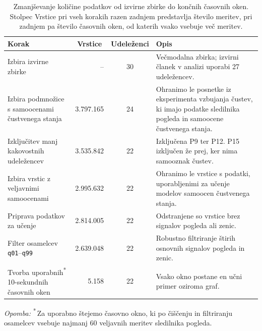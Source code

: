 \begin{table}[!htbp]
    \centering
    \caption{Zmanjševanje količine podatkov od izvirne zbirke \MAHNOB{} do končnih časovnih oken. Stolpec Vrstice pri vseh korakih razen zadnjem predstavlja število meritev, pri zadnjem pa število časovnih oken, od katerih vsako vsebuje več meritev.}
    \label{tab:mahnob-predobdelava}
    \small
    \begin{tabularx}{\textwidth}{@{}>{\raggedright\arraybackslash}p{} r c >{\raggedright\arraybackslash}X@{}}
        \toprule
        \textbf{Korak} & \multicolumn{1}{c}{\textbf{Vrstice}} & \multicolumn{1}{c}{\textbf{Udeleženci}} & \textbf{Opis} \\
        \midrule
        Izbira izvirne zbirke \MAHNOB{} & -- & 30 & Večmodalna zbirka; izvirni članek v analizi uporabi 27 udeležencev. \\
        \midrule
        Izbira podmnožice s samoocenami čustvenega stanja & 3.797.165 & 24 & Ohranimo le posnetke iz eksperimenta vzbujanja čustev, ki imajo podatke sledilnika pogleda in samoocene čustvenega stanja. \\
        \midrule
        Izključitev manj kakovostnih udeležencev & 3.535.842 & 22 & Izključena P9 ter P12. P15 izključen že prej, ker nima samooznak čustev. \\
        \midrule
        Izbira vrstic z veljavnimi samoocenami & 2.995.632 & 22 & Ohranimo le vrstice s podatki, uporabljenimi za učenje modelov samoocen čustvenega stanja. \\
        \midrule
        Priprava podatkov za učenje & 2.814.005 & 22 & Odstranjene so vrstice brez signalov pogleda ali zenic. \\
        \midrule
        Filter osamelcev \texttt{q01}--\texttt{q99} & 2.639.048 & 22 & Robustno filtriranje štirih osnovnih signalov pogleda in zenic. \\
        \midrule
        Tvorba uporabnih\textsuperscript{*} 10-sekundnih časovnih oken & 5.158 & 22 & Vsako okno postane en učni primer oziroma graf. \\
        \bottomrule
    \end{tabularx}
    \vspace{0.4em}
    \parbox{\textwidth}{\footnotesize \emph{Opomba:} \textsuperscript{*}\,Za uporabno štejemo časovno okno, ki po čiščenju in filtriranju osamelcev vsebuje najmanj 60 veljavnih meritev sledilnika pogleda.}
\end{table}
